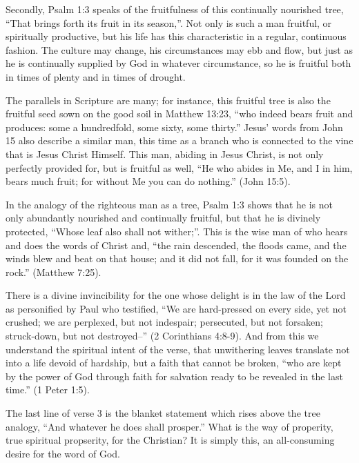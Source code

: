 Secondly, Psalm 1:3 speaks of the fruitfulness of this continually nourished tree,
    ``That brings forth its fruit in its season,''.
Not only is such a man fruitful, or spiritually productive,
    but his life has this characteristic in a regular, continuous fashion.
The culture may change, his circumstances may ebb and flow,
    but just as he is continually supplied by God in whatever circumstance,
    so he is fruitful both in times of plenty and in times of drought.

The parallels in Scripture are many;
    for instance, this fruitful tree is also
    the fruitful seed sown on the good soil in Matthew 13:23,
    ``who indeed bears fruit and produces:
    some a hundredfold, some sixty, some thirty.''
Jesus' words from John 15 also describe a similar man,
    this time as a branch who is connected to the vine that is Jesus Christ Himself.
This man, abiding in Jesus Christ, is not only perfectly provided for, 
    but is fruitful as well, 
    ``He who abides in Me, and I in him, 
    bears much fruit; for without Me you can do nothing.'' (John 15:5).

In the analogy of the righteous man as a tree, 
    Psalm 1:3 shows that he is not only 
    abundantly nourished and continually fruitful,
    but that he is divinely protected,
    ``Whose leaf also shall not wither;''.
This is the wise man of who hears and does the words of Christ
    and, ``the rain descended, the floods came, and the winds blew and beat 
    on that house; and it did not fall, for it was founded on the rock.''
    (Matthew 7:25).

There is a divine invincibility for the one whose delight is in
    the law of the Lord as personified by Paul who testified,
    ``We are hard-pressed on every side, yet not crushed;
    we are perplexed, but not indespair;
    persecuted, but not forsaken;
    struck-down, but not destroyed--'' (2 Corinthians 4:8-9).
And from this we understand the spiritual intent of the verse,
    that unwithering leaves translate not into a life devoid of hardship,
    but a faith that cannot be broken,
    ``who are kept by the power of God through faith for salvation ready
    to be revealed in the last time.'' (1 Peter 1:5).

The last line of verse 3 is the blanket statement
    which rises above the tree analogy,
    ``And whatever he does shall prosper.''
What is the way of properity, true spiritual propserity,
    for the Christian?
It is simply this, an all-consuming desire for the word of God.

